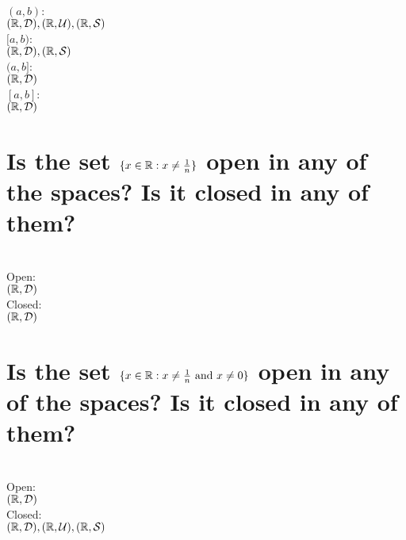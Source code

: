 
\begin{solution}
 \\$(a,b)$: \\
 $(\mathbb{R}, \mathcal{D}), (\mathbb{R}, \mathcal{U}), (\mathbb{R}, \mathcal{S})$ \\
 $[a,b)$: \\
 $(\mathbb{R}, \mathcal{D}), (\mathbb{R}, \mathcal{S})$ \\
 $(a,b]$: \\
 $(\mathbb{R}, \mathcal{D})$ \\
 $[a,b]$: \\
 $(\mathbb{R}, \mathcal{D})$ \\
\end{solution}

\begin{parts}

\part{Is the set $\{x \in \mathbb{R}: x \neq \frac{1}{n}\}$ open in any of the spaces? Is it closed in any of them?}

\begin{solution}
 \\Open: \\
 $(\mathbb{R}, \mathcal{D})$ \\
 Closed: \\
 $(\mathbb{R}, \mathcal{D})$ \\
\end{solution}

\part{Is the set $\{x \in \mathbb{R}: x \neq \frac{1}{n} \text{ and } x \neq 0\}$ open in any of the spaces? Is it closed in any of them?}

\begin{solution}
 \\Open: \\
 $(\mathbb{R}, \mathcal{D})$ \\
 Closed: \\
 $(\mathbb{R}, \mathcal{D}), (\mathbb{R}, \mathcal{U}), (\mathbb{R}, \mathcal{S})$ \\
\end{solution}

\end{parts}



